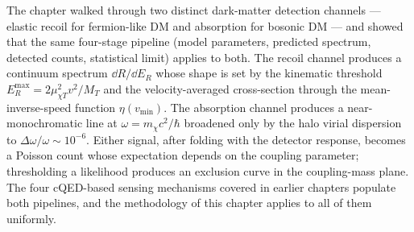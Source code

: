 The chapter walked through two distinct dark-matter detection
channels --- elastic recoil for fermion-like DM and absorption for
bosonic DM --- and showed that the same four-stage pipeline (model
parameters, predicted spectrum, detected counts, statistical limit)
applies to both. The recoil channel produces a continuum spectrum
$\dd R/\dd E_R$ whose shape is set by the kinematic threshold
$E_R^\text{max}=2\mu_{\chi T}^2 v^2/M_T$ and the velocity-averaged
cross-section through the mean-inverse-speed function $\eta(v_\text{min})$.
The absorption channel produces a near-monochromatic line at
$\omega=m_\chi c^2/\hbar$ broadened only by the halo virial
dispersion to $\Delta\omega/\omega\sim 10^{-6}$. Either signal, after
folding with the detector response, becomes a Poisson count whose
expectation depends on the coupling parameter; thresholding a
likelihood produces an exclusion curve in the coupling-mass plane.
The four cQED-based sensing mechanisms covered in earlier chapters
populate both pipelines, and the methodology of this chapter
applies to all of them uniformly.

